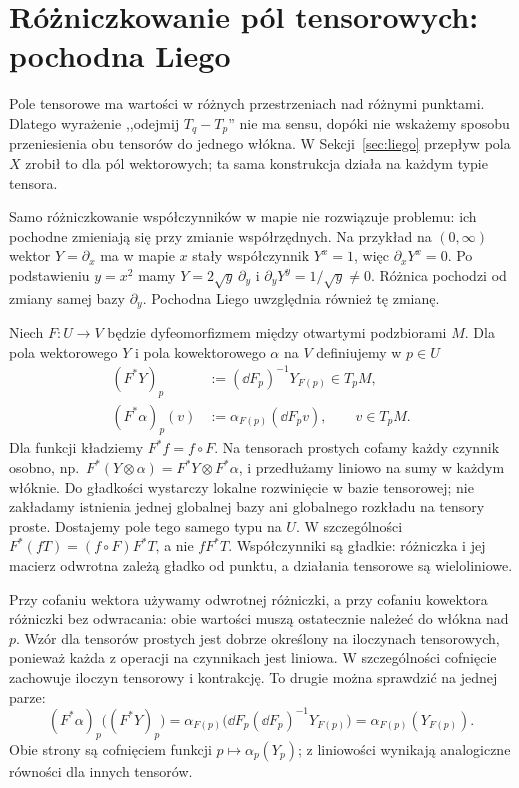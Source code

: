 \section{Różniczkowanie pól tensorowych: pochodna Liego}
\label{sec:lie-tensory}

Pole tensorowe ma wartości w różnych przestrzeniach nad
różnymi punktami. Dlatego wyrażenie ,,odejmij $T_q-T_p$''
nie ma sensu, dopóki nie wskażemy sposobu przeniesienia
obu tensorów do jednego włókna. W Sekcji~\ref{sec:liego}
przepływ pola $X$ zrobił to dla pól wektorowych;
ta sama konstrukcja działa na każdym typie tensora.

Samo różniczkowanie współczynników w mapie nie rozwiązuje
problemu: ich pochodne zmieniają się przy zmianie współrzędnych.
Na przykład na $(0,\infty)$ wektor $Y=\partial_x$ ma w
mapie $x$ stały współczynnik $Y^x=1$, więc
$\partial_xY^x=0$. Po podstawieniu $y=x^2$ mamy
$Y=2\sqrt y\,\partial_y$ i
$\partial_yY^y=1/\sqrt y\ne0$.
Różnica pochodzi od zmiany samej bazy $\partial_y$.
Pochodna Liego uwzględnia również tę zmianę.

\begin{definicja}
\label{def:cofniecie-tensora}
Niech $F\colon U\to V$ będzie dyfeomorfizmem między
otwartymi podzbiorami $M$. Dla pola wektorowego $Y$ i
pola kowektorowego $\alpha$ na $V$ definiujemy w $p\in U$
\begin{align*}
 (F^*Y)_p&:=(\dd F_p)^{-1}Y_{F(p)}\in T_pM,\\
 (F^*\alpha)_p(v)&:=\alpha_{F(p)}(\dd F_pv),
 \qquad v\in T_pM.
\end{align*}
Dla funkcji kładziemy $F^*f=f\circ F$.
Na tensorach prostych cofamy każdy czynnik osobno,
np.\ $F^*(Y\otimes\alpha)=F^*Y\otimes F^*\alpha$,
i przedłużamy liniowo na sumy w każdym włóknie. Do gładkości
wystarczy lokalne rozwinięcie w bazie tensorowej; nie zakładamy
istnienia jednej globalnej bazy ani globalnego rozkładu na tensory proste.
Dostajemy pole
tego samego typu na $U$. W szczególności
$F^*(fT)=(f\circ F)F^*T$, a nie $fF^*T$.
Współczynniki są gładkie: różniczka i jej macierz odwrotna
zależą gładko od punktu, a działania tensorowe są wieloliniowe.
\end{definicja}

Przy cofaniu wektora używamy odwrotnej różniczki,
a przy cofaniu kowektora różniczki bez odwracania:
obie wartości muszą ostatecznie należeć do włókna nad $p$.
Wzór dla tensorów prostych jest dobrze określony na
iloczynach tensorowych, ponieważ każda z operacji na
czynnikach jest liniowa. W szczególności cofnięcie zachowuje
iloczyn tensorowy i kontrakcję. To drugie można sprawdzić
na jednej parze:
\[
 (F^*\alpha)_p\bigl((F^*Y)_p\bigr)
 =\alpha_{F(p)}\bigl(\dd F_p(\dd F_p)^{-1}Y_{F(p)}\bigr)
 =\alpha_{F(p)}(Y_{F(p)}).
\]
Obie strony są cofnięciem funkcji $p\mapsto\alpha_p(Y_p)$;
z liniowości wynikają analogiczne równości dla innych tensorów.

